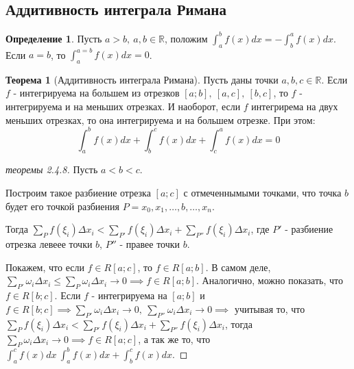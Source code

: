 \documentclass{report}
\theoremstyle{definition}
\newtheorem{definition}{Определение}[section]
\newtheorem{theorem}{Теорема}[section]
\begin{document}
\subsection{Аддитивность интеграла Римана}

\begin{definition}
  Пусть $a>b, \ a,b\in\mathbb{R}$, положим $\int_{a}^{b}f(x)dx = -\int_{b}^{a}f(x)dx$. Если $a=b$, то
  $\int_{a}^{a=b}f(x)dx =0$.
\end{definition}

\begin{theorem}[Аддитивность интеграла Римана]
  Пусть даны точки $a,b,c\in \mathbb{R}$. Если $f$ - интегрируема на большем из отрезков $[a;b],\ [a,c],\
    [b,c]$, то $f$ - интегрируема и на меньших отрезках. И наоборот, если $f$ интегрирема на двух меньших отрезках,
  то она интегрируема и на большем отрезке. При этом:
  \begin{equation*}
    \int_{a}^{b}f(x) dx + \int_{b}^{c}f(x)dx + \int_{c}^{a}f(x)dx = 0
  \end{equation*}
\end{theorem}

\begin{proof}[теоремы 2.4.8]
  Пусть $a<b<c$.

  Построим такое разбиение отрезка $[a;c]$ с отмеченнымыми точками, что точка $b$ будет его точкой разбиения
  $P = {x_{0}, x_{1}, \ldots, b, \ldots, x_{n}}$.

  Тогда $\underset{P}{\sum}f(\xi_{i})\Delta x_{i} < \underset{P'}{\sum}f(\xi_{i})\Delta x_{i} +
    \underset{P''}{\sum}f(\xi_{i})\Delta x_{i}$, где $P'$ - разбиение отрезка левеее точки $b$, $P''$ - правее
  точки $b$.

  Покажем, что если $f\in R[a;c]$, то $f\in R[a;b]$. В самом деле, $\underset{P'}{\sum}\omega_{i}\Delta x_{i}
    \leqslant \underset{P}{\sum}\omega_{i}\Delta x_{i}\rightarrow 0 \implies f\in R[a;b]$. Аналогично, можно
  показать, что $f\in R[b;c]$. Если $f$ - интегрируема на $[a;b]$ и $f\in R[b;c] \implies \underset{P'}{\sum}
    \omega_{i}\Delta x_{i} \rightarrow0, \ \underset{P''}{\sum}\omega_{i}\Delta x_{i} \rightarrow0 \implies$
  учитывая то, что $\underset{P}{\sum}f(\xi_{i})\Delta x_{i} < \underset{P'}{\sum}f(\xi_{i})\Delta x_{i} +
    \underset{P''}{\sum}f(\xi_{i})\Delta x_{i}$, тогда $\underset{P}{\sum}\omega_{i}\Delta x_{i}\rightarrow0
    \implies f\in R[a;c]$, а так же то, что $\int_{a}^{c}f(x) dx \ \int_{a}^{b}f(x) dx + \int_{b}^{c}f(x)dx$.
\end{proof}
\end{document}
